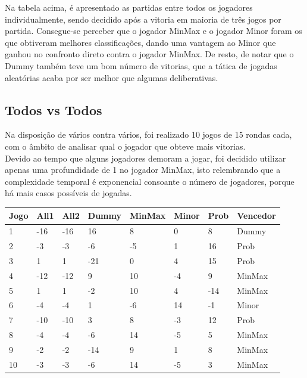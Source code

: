 \documentclass[12pt]{article}
\begin{document}
    Na tabela acima, é apresentado as partidas entre todos os jogadores individualmente, sendo decidido após a vitoria em maioria de três jogos por partida. Consegue-se perceber que o jogador MinMax e o jogador Minor foram os que obtiveram melhores classificações, dando uma vantagem ao Minor que ganhou no confronto direto contra o jogador MinMax. De resto, de notar que o Dummy também teve um bom número de vitorias, que a tática de jogadas aleatórias acaba por ser melhor que algumas deliberativas.\\
	
	\subsection*{Todos vs Todos}
    Na disposição de vários contra vários, foi realizado 10 jogos de 15 rondas cada, com o âmbito de analisar qual o jogador que obteve mais vitorias.\\
    Devido ao tempo que alguns jogadores demoram a jogar, foi decidido utilizar apenas uma profundidade de 1 no jogador MinMax, isto relembrando que a complexidade temporal é exponencial consoante o número de jogadores, porque há mais casos possíveis de jogadas.

    
    
	\begin{center}
	    \begin{tabular}{ |p{1.5cm}|p{1.5cm}|p{1.5cm}|p{1.5cm}|p{1.5cm}|p{1.5cm}|p{1.5cm}|p{2cm}|  }
	    \hline
	    Jogo & All1	& All2	& Dummy & MinMax & Minor & Prob & Vencedor\\\hline
	    1	& -16	& -16	& 16	& 8	    & 0	    & 8	    & Dummy\\\hline
        2	& -3	& -3	& -6	& -5	& 1	    & 16	& Prob\\\hline
        3	& 1	    & 1	    & -21	& 0     & 4	    & 15	& Prob\\\hline
        4	& -12	& -12	& 9	    &10     & -4	& 9	    & MinMax\\\hline
        5	& 1	    & 1	    & -2	& 10	& 4	    & -14	& MinMax\\\hline
        6	& -4	& -4	& 1	    & -6	& 14	& -1	& Minor\\\hline
        7	& -10	& -10	& 3	    & 8	    & -3	& 12	& Prob\\\hline
        8	& -4	& -4	& -6	& 14	&-5	    & 5	    & MinMax\\\hline
        9	& -2	& -2	& -14	& 9	    & 1	    & 8	    & MinMax\\\hline
        10	& -3	& -3	& -6	& 14	&-5	    & 3	    & MinMax\\\hline
	    \end{tabular}
	\end{center}
	
\end{document}
